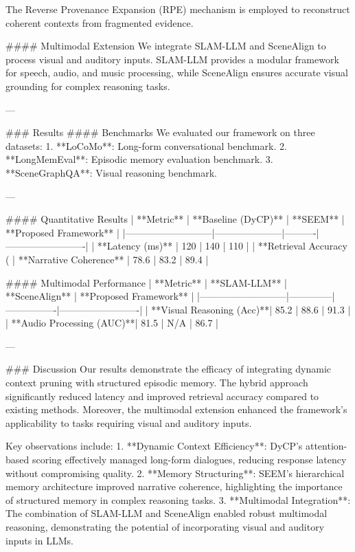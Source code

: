 The Reverse Provenance Expansion (RPE) mechanism is employed to reconstruct coherent contexts from fragmented evidence.

#### Multimodal Extension
We integrate SLAM-LLM and SceneAlign to process visual and auditory inputs. SLAM-LLM provides a modular framework for speech, audio, and music processing, while SceneAlign ensures accurate visual grounding for complex reasoning tasks.

---

### Results
#### Benchmarks
We evaluated our framework on three datasets:
1. **LoCoMo**: Long-form conversational benchmark.
2. **LongMemEval**: Episodic memory evaluation benchmark.
3. **SceneGraphQA**: Visual reasoning benchmark.

---

#### Quantitative Results
| **Metric**                | **Baseline (DyCP)** | **SEEM** | **Proposed Framework** |
|---------------------------|---------------------|----------|-------------------------|
| **Latency (ms)**          | 120                | 140      | 110                     |
| **Retrieval Accuracy (%
| **Narrative Coherence**   | 78.6               | 83.2     | 89.4                    |

#### Multimodal Performance
| **Metric**                | **SLAM-LLM** | **SceneAlign** | **Proposed Framework** |
|---------------------------|--------------|----------------|-------------------------|
| **Visual Reasoning (Acc)**| 85.2         | 88.6           | 91.3                    |
| **Audio Processing (AUC)**| 81.5         | N/A            | 86.7                    |

---

### Discussion
Our results demonstrate the efficacy of integrating dynamic context pruning with structured episodic memory. The hybrid approach significantly reduced latency and improved retrieval accuracy compared to existing methods. Moreover, the multimodal extension enhanced the framework's applicability to tasks requiring visual and auditory inputs.

Key observations include:
1. **Dynamic Context Efficiency**: DyCP's attention-based scoring effectively managed long-form dialogues, reducing response latency without compromising quality.
2. **Memory Structuring**: SEEM's hierarchical memory architecture improved narrative coherence, highlighting the importance of structured memory in complex reasoning tasks.
3. **Multimodal Integration**: The combination of SLAM-LLM and SceneAlign enabled robust multimodal reasoning, demonstrating the potential of incorporating visual and auditory inputs in LLMs.

